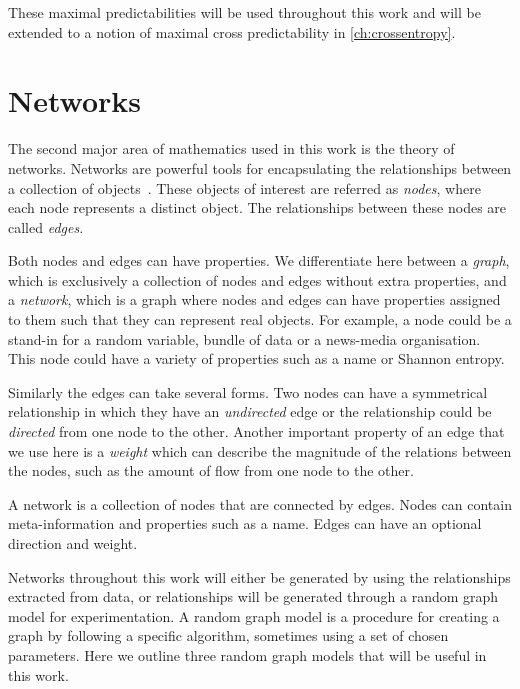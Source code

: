 These maximal predictabilities will be used throughout this work and will be extended to a notion of maximal cross predictability in \autoref{ch:crossentropy}.


\section{Networks}

The second major area of mathematics used in this work is the theory of networks. Networks are powerful tools for encapsulating the relationships between a collection of objects~\cite{newman_networks_2018}. These objects of interest are referred as \emph{nodes}, where each node represents a distinct object. The relationships between these nodes are called \emph{edges}.

Both nodes and edges can have properties.  We differentiate here between a \emph{graph}, which is exclusively a collection of nodes and edges without extra properties, and a \emph{network}, which is a graph where nodes and edges can have properties assigned to them such that they can represent real objects. For example, a node could be a stand-in for a random variable, bundle of data or a news-media organisation. This node could have a variety of properties such as a name or Shannon entropy.

Similarly the edges can take several forms. Two nodes can have a symmetrical relationship in which they have an \emph{undirected} edge or the relationship could be \emph{directed} from one node to the other. Another important property of an edge that we use here is a \emph{weight} which can describe the magnitude of the relations between the nodes, such as the amount of flow from one node to the other.

\begin{definition}
	A network is a collection of nodes that are connected by edges. Nodes can contain meta-information and properties such as a name. Edges can have an optional direction and weight.
\end{definition}

Networks throughout this work will either be generated by using the relationships extracted from data, or relationships will be generated through a random graph model for experimentation. A random graph model is a procedure for creating a graph by following a specific algorithm, sometimes using a set of chosen parameters.  Here we outline three random graph models that will be useful in this work.

